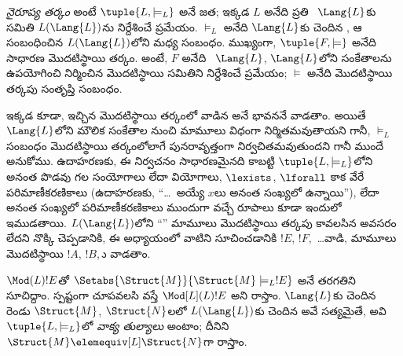 \documentclass[../../../include/open-logic-section]{subfiles}
\begin{document}

\begin{defn}
\emph{నైరూప్య తర్కం} అంటే $\tuple{L, \models_L}$ అనే జత; ఇక్కడ $L$
అనేది ప్రతి ~$\Lang{L}$కు
 సమితి $L(\Lang{L})$ను నిర్దేశించే
ప్రమేయం. $\models_L$ అనేది $\Lang{L}$కు చెందిన
, ఆ
 సంబంధించిన $L(\Lang{L})$లోని
 మధ్య సంబంధం. ముఖ్యంగా,
$\tuple{F, \models}$ అనేది సాధారణ మొదటిస్థాయి తర్కం. అంటే, $F$ అనేది
~$\Lang{L}$, $\Lang{L}$లోని సంకేతాలను
ఉపయోగించి నిర్మించిన మొదటిస్థాయి 
సమితిని నిర్దేశించే ప్రమేయం; $\models$ అనేది మొదటిస్థాయి తర్కపు
సంతృప్తి సంబంధం.
\end{defn}

ఇక్కడ కూడా, ఇచ్చిన  మొదటిస్థాయి
తర్కంలో వాడిన  అనే భావననే వాడతాం.
అయితే  $\Lang{L}$లోని మౌలిక
సంకేతాల నుంచి మామూలు విధంగా నిర్మితమవుతాయని గానీ, $\models_L$
సంబంధం మొదటిస్థాయి తర్కంలోలాగే పునరావృత్తంగా నిర్వచితమవుతుందని గానీ
ముందే అనుకోము. ఉదాహరణకు, ఈ నిర్వచనం సాధారణమైనది కాబట్టి
$\tuple{L,\models_L}$లోని  అనంత పొడవు గల సంయోగాలు లేదా వియోగాలు, $\lexists$, $\lforall$ కాక వేరే
పరిమాణీకరణికాలు (ఉదాహరణకు, “\dots~అయ్యే $x$లు అనంత సంఖ్యలో ఉన్నాయి”),
లేదా అనంత సంఖ్యలో పరిమాణీకరణికాలు ముందుగా వచ్చే రూపాలు కూడా
ఇందులో ఇముడతాయి. $L(\Lang{L})$లోని
“” మామూలు మొదటిస్థాయి తర్కపు
 కావలసిన అవసరం లేదని నొక్కి చెప్పడానికి,
ఈ అధ్యాయంలో వాటిని సూచించడానికి 
$!E$, $!F$,~\dots వాడి, మామూలు మొదటిస్థాయి
 $!A$, $!B$,~ు వాడతాం.

\begin{defn}
$\Mod(L){!E}$తో $\Setabs{\Struct{M}}{\Struct{M}
  \models_L !E}$ అనే తరగతిని సూచిద్దాం. 
స్పష్టంగా చూపవలసి వస్తే $\Mod[L](L){!E}$ అని రాస్తాం.
$\Lang{L}$కు చెందిన రెండు 
$\Struct{M}$, $\Struct{N}$లలో $L(\Lang{L})$కు చెందిన అవే
 సత్యమైతే, అవి $\tuple{L,
\models_L}$లో \emph{వాక్య తుల్యాలు} అంటాం; దీనిని
$\Struct{M} \elemequiv[L] \Struct{N}$గా రాస్తాం.
\end{defn}
\end{document}
